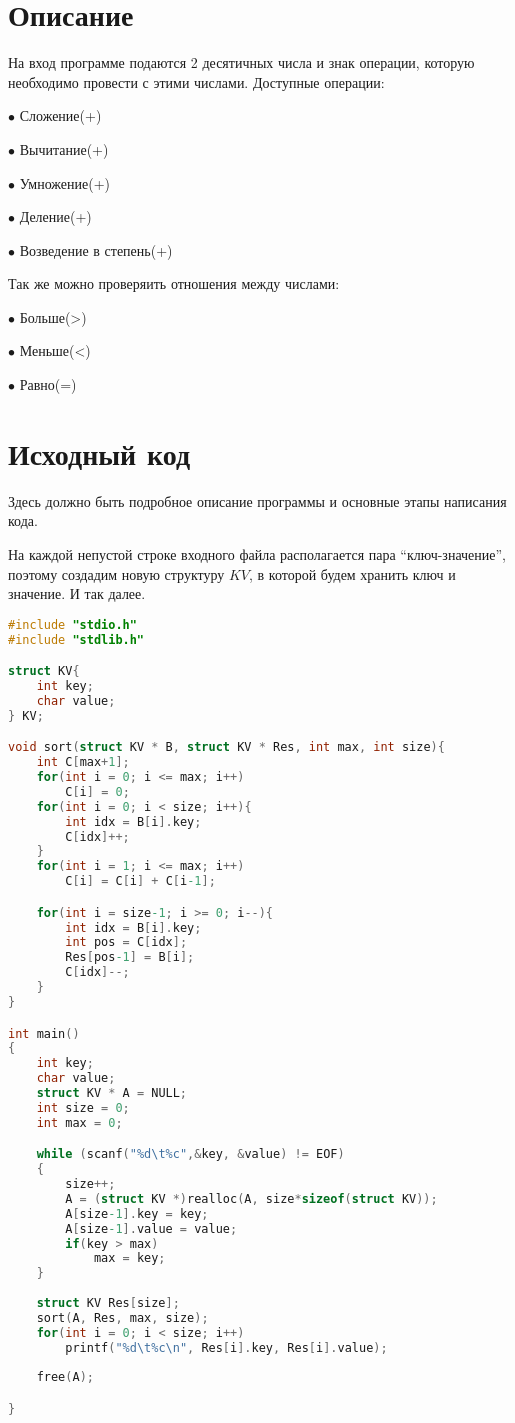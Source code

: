 \section{Описание}
На вход программе подаются 2 десятичных числа и знак операции, которую необходимо провести с этими числами. Доступные операции: 

$\bullet$ Сложение(+)

$\bullet$ Вычитание(+)

$\bullet$ Умножение(+)

$\bullet$ Деление(+)

$\bullet$ Возведение в степень(+)

Так же можно проверяить отношения между числами:

$\bullet$ Больше(>)

$\bullet$ Меньше(<)

$\bullet$ Равно(=)
\pagebreak

\section{Исходный код}
Здесь должно быть подробное описание программы и основные этапы написания кода.

На каждой непустой строке входного файла располагается пара \enquote{ключ-значение}, поэтому создадим новую 
структуру $KV$, в которой будем хранить ключ и значение. И так далее.

\begin{lstlisting}[language=C]
#include "stdio.h"
#include "stdlib.h"

struct KV{
	int key;
	char value;
} KV;

void sort(struct KV * B, struct KV * Res, int max, int size){
	int C[max+1];
	for(int i = 0; i <= max; i++)
		C[i] = 0;
	for(int i = 0; i < size; i++){
		int idx = B[i].key;
		C[idx]++;
	}
	for(int i = 1; i <= max; i++)
		C[i] = C[i] + C[i-1];

	for(int i = size-1; i >= 0; i--){
		int idx = B[i].key;
		int pos = C[idx];
		Res[pos-1] = B[i];
		C[idx]--;
	}
}

int main()
{
	int key;
	char value;
	struct KV * A = NULL;
	int size = 0;
	int max = 0;

	while (scanf("%d\t%c",&key, &value) != EOF)
	{
		size++;
		A = (struct KV *)realloc(A, size*sizeof(struct KV));
		A[size-1].key = key;
		A[size-1].value = value;
		if(key > max)
			max = key;
	}
	
	struct KV Res[size];
	sort(A, Res, max, size);
	for(int i = 0; i < size; i++)
		printf("%d\t%c\n", Res[i].key, Res[i].value);
	    
    free(A);

}
	
\end{lstlisting}

